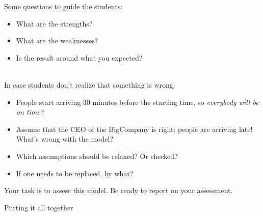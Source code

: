 \begin{annotation}
	\begin{notes}

Some questions to guide the students:
	\begin{itemize}
	\item What are the strengths?
	\item What are the weaknesses?
	\item Is the result around what you expected?
\end{itemize}	
	
\hfill \\
In case students don't realize that something is wrong:
\begin{itemize}
	\item People start arriving 30 minutes before the starting time, so \emph{everybody will be on time?}
	\item Assume that the CEO of the BigCompany is right: people are arriving late! What's wrong with the model?

	\item Which assumptions should be relaxed? Or checked?
	\item If one needs to be replaced, by what?
	\end{itemize}
	
	\end{notes}
\end{annotation}

Your task is to assess this model.
Be ready to report on your assessment.



















\newpage


%
%



\begin{module}{Putting it all together}
	\label{report}

	
	
\end{module}



